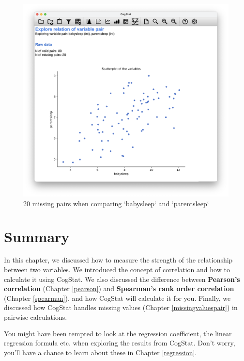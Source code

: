 \documentclass[
  11pt,
]{book}
\theoremstyle{indenteddefinition}
\theoremstyle{indenteddefinition}
\theoremstyle{definition}
\theoremstyle{definition}
\theoremstyle{remark}
\begin{document}
\begin{figure}

{\centering \includegraphics[width=0.66\linewidth]{resources/image/cogstatparentsleepbabysleepmissing} 

}

\caption{20 missing pairs when comparing `babysleep` and `parentsleep`}\label{fig:parenthoodmissingcog3}
\end{figure}

\hypertarget{summary-1}{%
\section{Summary}\label{summary-1}}

In this chapter, we discussed how to measure the strength of the relationship between two variables. We introduced the concept of correlation and how to calculate it using CogStat. We also discussed the difference between \textbf{Pearson's correlation} (Chapter \ref{pearson}) and \textbf{Spearman's rank order correlation} (Chapter \ref{spearman}), and how CogStat will calculate it for you. Finally, we discussed how CogStat handles missing values (Chapter \ref{missingvaluespair}) in pairwise calculations.

You might have been tempted to look at the regression coefficient, the linear regression formula etc. when exploring the results from CogStat. Don't worry, you'll have a chance to learn about these in Chapter \ref{regression}.
\end{document}
